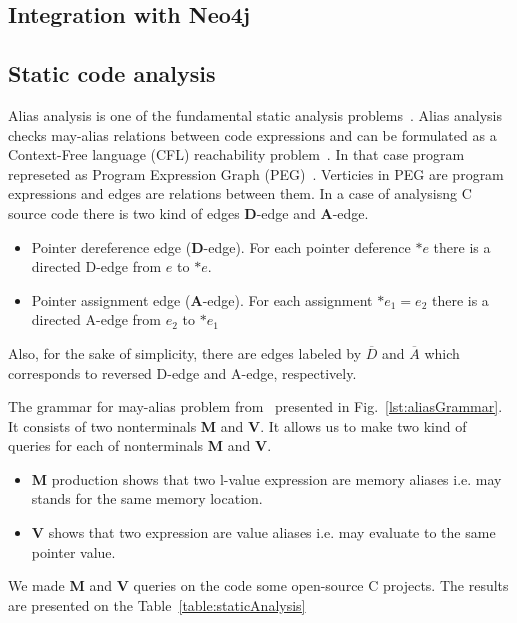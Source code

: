 \subsection{Integration with Neo4j}

\subsection{Static code analysis}

Alias analysis is one of the fundamental static analysis problems~\cite{Marlowe}.
Alias analysis checks may-alias relations between code expressions and can be formulated as a Context-Free language (CFL) reachability problem~\cite{Reps}.
In that case program represeted as Program Expression Graph (PEG)~\cite{Zheng}.
Verticies in PEG are program expressions and edges are relations between them.
In a case of analysisng C source code there is two kind of edges \textbf{D}-edge and \textbf{A}-edge.

\begin{itemize}
    \item Pointer dereference edge (\textbf{D}-edge). For each pointer deference $*e$ there is a directed D-edge from $e$ to $*e$.
    \item Pointer assignment edge (\textbf{A}-edge). For each assignment $*e_1=e_2$ there is a directed A-edge from $e_2$ to $*e_1$
\end{itemize}

Also, for the sake of simplicity, there are edges labeled by $\overline{D}$ and $\overline{A}$ which corresponds to reversed D-edge and A-edge, respectively.

The grammar for may-alias problem from~\cite{Zheng} presented in Fig.~\ref{lst:aliasGrammar}.
It consists of two nonterminals \textbf{M} and \textbf{V}.
It allows us to make two kind of queries for each of nonterminals \textbf{M} and \textbf{V}.

\begin{itemize}
    \item \textbf{M} production shows that two l-value expression are memory aliases i.e. may stands for the same memory location.
    \item \textbf{V} shows that two expression are value aliases i.e. may evaluate to the same pointer value.
\end{itemize}

We made \textbf{M} and \textbf{V} queries on the code some open-source C projects.
The results are presented on the Table~\ref{table:staticAnalysis} 

